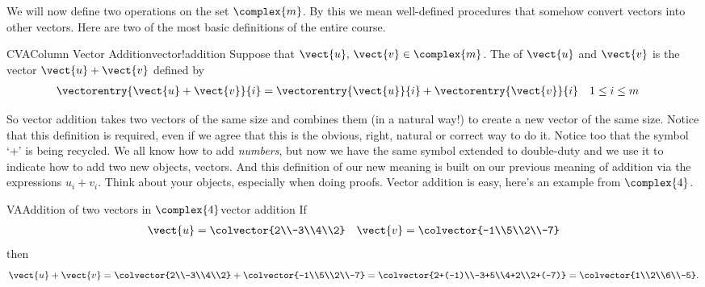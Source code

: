 %
We will now define two operations on the set $\complex{m}$.  By this we mean well-defined procedures that somehow convert vectors into other vectors.  Here are two of the most basic definitions of the entire course.
%
\begin{definition}{CVA}{Column Vector Addition}{vector!addition}
Suppose that $\vect{u},\,\vect{v}\in\complex{m}$. The  of $\vect{u}$ and $\vect{v}$ is the vector $\vect{u}+\vect{v}$ defined by
%
\begin{align*}
\vectorentry{\vect{u}+\vect{v}}{i}
&=\vectorentry{\vect{u}}{i}+\vectorentry{\vect{v}}{i}
&&1\leq i\leq m
\end{align*}
%
\end{definition}
%
So vector addition takes two vectors of the same size and combines them (in a natural way!) to create a new vector of the same size.  Notice that this definition is required, even if we agree that this is the obvious, right, natural or correct way to do it.  Notice too that the symbol `+' is being recycled.  We all know how to add {\em numbers}, but now we have the same symbol extended to double-duty and we use it to indicate how to add two new objects, vectors.  And this definition of our new meaning is built on our previous meaning of addition via the expressions $u_i+v_i$.  Think about your objects, especially when doing proofs.  Vector addition is easy, here's an example from $\complex{4}$.
%
\begin{example}{VA}{Addition of two vectors in $\complex{4}$}{vector addition}
If
%
\begin{align*}
\vect{u}=\colvector{2\\-3\\4\\2}&&\vect{v}=\colvector{-1\\5\\2\\-7}
\end{align*}
%
then
%
\begin{equation*}
\vect{u}+\vect{v}=
\colvector{2\\-3\\4\\2}+\colvector{-1\\5\\2\\-7}=
\colvector{2+(-1)\\-3+5\\4+2\\2+(-7)}=
\colvector{1\\2\\6\\-5}.
\end{equation*}
%
\end{example}
